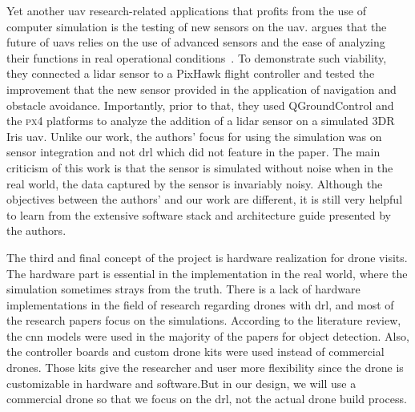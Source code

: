 \documentclass[../main.tex]{subfiles}
\begin{document}
	Yet another \gls{uav} research-related applications 
	that profits from the use of computer simulation 
	is the testing of new sensors on the \gls{uav}.
	\citeauthor{Gar20} argues that the future of \glspl{uav}
	relies on the use of advanced sensors and 
	the ease of analyzing their functions
	in real operational conditions~\cite{Gar20}.
	To demonstrate such viability, they connected a \gls{lidar} sensor
	to a PixHawk flight controller and tested the improvement
	that the new sensor provided
	in the application of navigation and obstacle avoidance.
	Importantly, prior to that, they used QGroundControl and the \textsc{px4}
	platforms to analyze the addition of a \gls{lidar} sensor
	on a simulated 3DR Iris \gls{uav}.
	Unlike our work, the authors' focus for using the simulation
	was on sensor integration and not \gls{drl} 
	which did not feature in the paper. 
	The main criticism of this work is that 
	the sensor is simulated without noise
	when in the real world, the data captured
	by the sensor is invariably noisy.
	Although the objectives between the authors' and our work
	are different, it is still very helpful to learn from
	the extensive software stack and architecture guide 
	presented by the authors.
	
	
	The third and final concept of the project is hardware realization for drone visits.
	The hardware part is essential in the implementation in the real world, where the simulation sometimes strays from the truth.
	There is a lack of hardware implementations in the field of research regarding drones with \gls{drl}, and most of the research papers focus on the simulations.
	According to the literature review, the \gls{cnn} models were used in the majority of the papers for object detection. 
	Also, the controller boards and custom drone kits were used instead of commercial drones.
	Those kits give the researcher and user more flexibility since the drone is customizable 
	in hardware and software.But in our design, we will use a commercial drone so that we focus
	on the \gls{drl}, not the actual drone build process. 
	
	
\end{document}
